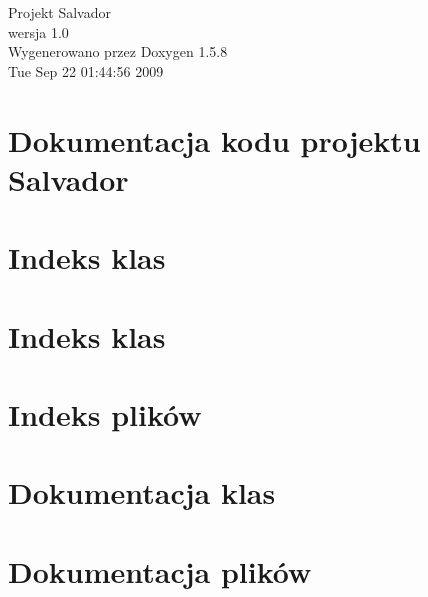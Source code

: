 \documentclass[a4paper]{book}
\begin{document}
\begin{titlepage}
\vspace*{7cm}
\begin{center}
{\Large Projekt Salvador \\[1ex]\large wersja 1.0 }\\
\vspace*{1cm}
{\large Wygenerowano przez Doxygen 1.5.8}\\
\vspace*{0.5cm}
{\small Tue Sep 22 01:44:56 2009}\\
\end{center}
\end{titlepage}
\clearemptydoublepage
{}
\tableofcontents
\clearemptydoublepage
{}
\chapter{Dokumentacja kodu projektu Salvador}
\label{index}\hypertarget{index}{}
\chapter{Indeks klas}

\chapter{Indeks klas}

\chapter{Indeks plików}

\chapter{Dokumentacja klas}










\chapter{Dokumentacja plików}























\printindex
\end{document}
